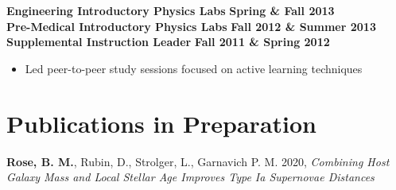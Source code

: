 \documentclass[margin]{res}
\begin{document}
\begin{resume}
\textbf{Engineering Introductory Physics Labs} \hfill{} \textbf{Spring \& Fall 2013}\\
\textbf{Pre-Medical Introductory Physics Labs} \hfill{} \textbf{Fall 2012 \& Summer 2013}\\
{\bf Supplemental Instruction Leader} \hfill{} \textbf{Fall 2011 \& Spring 2012}
    \begin{itemize}\itemsep -2pt
    \item[] Led peer-to-peer study sessions focused on active learning techniques
    \end{itemize}

\begin{comment}
year |   Fall        | Spring        | Summer
1st  | Labs-premed   | labs-eng      | labs-premed
2nd  | Labs-eng      | RA            | RA
3rd  | RA/IntroAstro | Peter's intro | RA
4th  | IntroAstro    | Python        | RA
5th  | Physics C HW  | RA            | RA & REU classes
6th  | Fellowship (GRE Class) | Python | NA!?!
\end{comment}













\section{Publications in Preparation}



\hangindent=15pt 
\hangindent=15pt 
{\bf Rose, B. M.}, Rubin, D., Strolger, L., Garnavich P. M. 2020, {\sl Combining Host Galaxy Mass and Local Stellar Age Improves Type Ia Supernovae Distances}


\end{resume}
\end{document}
